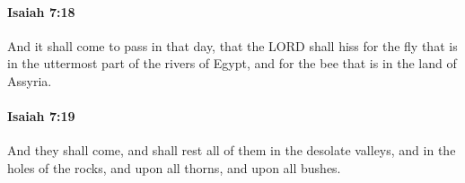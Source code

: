 		\paragraph{Isaiah 7:18} %
			\label{ISAIAH-7-18}

			And it shall come to pass in that day, that the LORD shall hiss for the fly that is in the uttermost part of the rivers of Egypt, and for the bee that is in the land of Assyria.


		\paragraph{Isaiah 7:19} %
			\label{ISAIAH-7-19}

			And they shall come, and shall rest all of them in the desolate valleys, and in the holes of the rocks, and upon all thorns, and upon all bushes.


